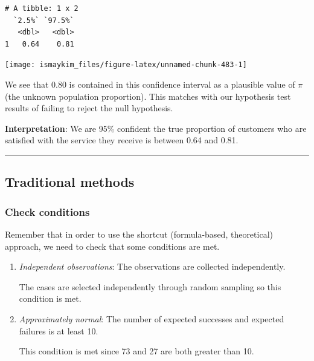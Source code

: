 \documentclass[12pt,]{krantz}
\makeatletter
\newenvironment{Shaded}{\begin{snugshade}}{\end{snugshade}}
\newcommand{\KeywordTok}[1]{\textcolor[rgb]{0.27,0.27,0.27}{\textbf{#1}}}
\newcommand{\DataTypeTok}[1]{\textcolor[rgb]{0.27,0.27,0.27}{#1}}
\newcommand{\StringTok}[1]{\textcolor[rgb]{0.5,0.5,0.5}{#1}}
\newcommand{\OperatorTok}[1]{\textcolor[rgb]{0.43,0.43,0.43}{\textbf{#1}}}
\newcommand{\NormalTok}[1]{#1}
\newenvironment{kframe}{%
\medskip{}
\setlength{\fboxsep}{.8em}
 \def\at@end@of@kframe{}%
 \ifinner\ifhmode%
  \def\at@end@of@kframe{\end{minipage}}%
  \begin{minipage}{\columnwidth}%
 \fi\fi%
 \def\FrameCommand##1{\hskip\@totalleftmargin \hskip-\fboxsep
 \colorbox{shadecolor}{##1}\hskip-\fboxsep
     \hskip-\linewidth \hskip-\@totalleftmargin \hskip\columnwidth}%
 \MakeFramed {\advance\hsize-\width
   \@totalleftmargin\z@ \linewidth\hsize
   \@setminipage}}%
 {\par\unskip\endMakeFramed%
 \at@end@of@kframe}
\renewenvironment{Shaded}{\begin{kframe}}{\end{kframe}}
\theoremstyle{definition}
\theoremstyle{definition}
\theoremstyle{definition}
\theoremstyle{remark}
\makeatother
\begin{document}
\begin{verbatim}
# A tibble: 1 x 2
  `2.5%` `97.5%`
   <dbl>   <dbl>
1   0.64    0.81
\end{verbatim}

\begin{Shaded}
\end{Shaded}

\begin{center}\texttt{[image: ismaykim\_files/figure-latex/unnamed-chunk-483-1]} \end{center}

We see that 0.80 is contained in this confidence interval as a plausible
value of \(\pi\) (the unknown population proportion). This matches with
our hypothesis test results of failing to reject the null hypothesis.

\textbf{Interpretation}: We are 95\% confident the true proportion of
customers who are satisfied with the service they receive is between
0.64 and 0.81.

\begin{center}\rule{0.5\linewidth}{\linethickness}\end{center}

\subsection{Traditional methods}\label{traditional-methods-1}

\subsubsection*{Check conditions}\label{check-conditions-1}


Remember that in order to use the shortcut (formula-based, theoretical)
approach, we need to check that some conditions are met.

\begin{enumerate}
\def\labelenumi{\arabic{enumi}.}
\item
  \emph{Independent observations}: The observations are collected
  independently.

  The cases are selected independently through random sampling so this
  condition is met.
\item
  \emph{Approximately normal}: The number of expected successes and
  expected failures is at least 10.

  This condition is met since 73 and 27 are both greater than 10.
\end{enumerate}
\end{document}
